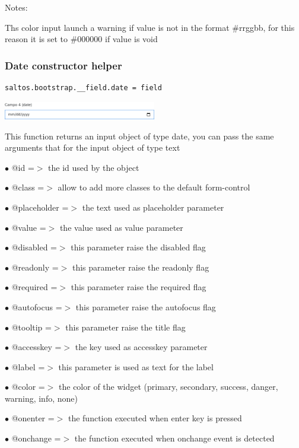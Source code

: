 \documentclass[a4paper]{article}
\begin{document}
Notes:

Ths color input launch a warning if value is not in the format \#rrggbb,
for this reason it is set to \#000000 if value is void

\hypertarget{toc55}{}
\subsubsection{Date constructor helper}

\begin{lstlisting}
saltos.bootstrap.__field.date = field
\end{lstlisting}

\begin{center}\includegraphics[width=0.5\textwidth]{../ujest/snaps/test-bootstrap-js-bootstrap-campo-4-date-1-snap.png}\end{center}

This function returns an input object of type date, you can pass the same arguments
that for the input object of type text

\begin{compactitem}
\item[\color{myblue}$\bullet$] @id          =$>$ the id used by the object
\item[\color{myblue}$\bullet$] @class       =$>$ allow to add more classes to the default form-control
\item[\color{myblue}$\bullet$] @placeholder =$>$ the text used as placeholder parameter
\item[\color{myblue}$\bullet$] @value       =$>$ the value used as value parameter
\item[\color{myblue}$\bullet$] @disabled    =$>$ this parameter raise the disabled flag
\item[\color{myblue}$\bullet$] @readonly    =$>$ this parameter raise the readonly flag
\item[\color{myblue}$\bullet$] @required    =$>$ this parameter raise the required flag
\item[\color{myblue}$\bullet$] @autofocus   =$>$ this parameter raise the autofocus flag
\item[\color{myblue}$\bullet$] @tooltip     =$>$ this parameter raise the title flag
\item[\color{myblue}$\bullet$] @accesskey   =$>$ the key used as accesskey parameter
\item[\color{myblue}$\bullet$] @label       =$>$ this parameter is used as text for the label
\item[\color{myblue}$\bullet$] @color       =$>$ the color of the widget (primary, secondary, success, danger, warning, info, none)
\item[\color{myblue}$\bullet$] @onenter     =$>$ the function executed when enter key is pressed
\item[\color{myblue}$\bullet$] @onchange    =$>$ the function executed when onchange event is detected
\end{compactitem}
\end{document}
